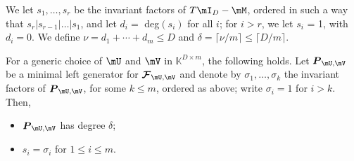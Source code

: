 \documentclass[12pt]{article}
\newcommand{\mat}[1]{\bm{\MakeUppercase{#1}}} %
\newcommand{\seq}{\mat{\mathcal{F}}} %
\newcommand{\todo}[1]{\textcolor{red}{{\bf todo:} #1}}
\def\K{\mathbb{K}}
\def\K {\ensuremath{\mathbb{K}}}
\begin{document}
We let $s_1, \dots, s_r$ be the invariant factors of $T\mI_D
- \mM$, ordered in such a way that $s_r | s_{r-1}| \dots | s_1$, and
let $d_i = $ deg$(s_i)$ for all $i$; for $i > r$, we let $s_i$ = 1,
with $d_i = 0$.  We define $\nu = d_1 + \cdots + d_m \le D$ and
$\delta = \lceil \nu / m \rceil \le \lceil D / m \rceil$.



\begin{theorem}
  \label{randXY}
  For a generic choice of $\mU$ and $\mV$ in $\K^{D \times m}$, the
  following holds.  Let $\mat{P}_{\mU,\mV}$ be a minimal left
  generator for $\seq_{\mU,\mV}$ and denote by $\sigma_1, \dots,
  \sigma_k$ the invariant factors of $\mat{P}_{\mU,\mV}$, for some $k
  \le m$, ordered as above; write $\sigma_i=1$ for $i > k$. Then,
  \begin{itemize}
  \item $\mat{P}_{\mU,\mV}$ has degree $\delta$;
  \item $s_i = \sigma_i$ for $1 \le i \le m$.
  \end{itemize}
\end{theorem}
\end{document}

